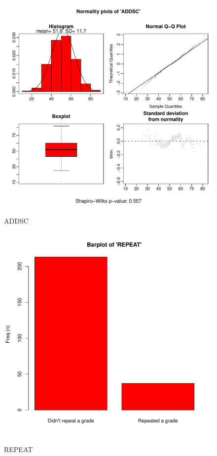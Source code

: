 \documentclass[a4paper,titlepage,12pt]{article}
\begin{document}
  \begin{figure}[H]
  \begin{center}
  \caption{ADDSC}
  \includegraphics[width=17cm]{./allgroups_report_figures/uni_ADDSC.pdf}
  \end{center}
  \end{figure}
  
  \begin{figure}[H]
  \begin{center}
  \caption{REPEAT}
  \includegraphics[width=17cm]{./allgroups_report_figures/uni_REPEAT.pdf}
  \end{center}
  \end{figure}
  
\end{document}
